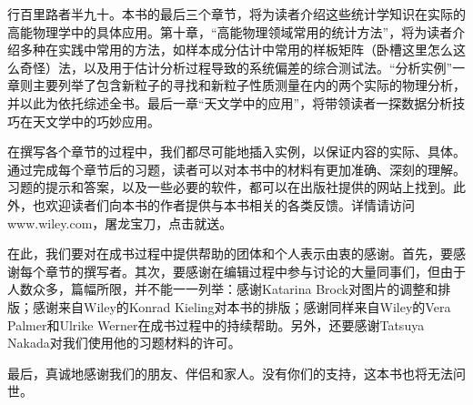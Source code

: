 行百里路者半九十。本书的最后三个章节，将为读者介绍这些统计学知识在实际的高能物理学中的具体应用。第十章，“高能物理领域常用的统计方法”，将为读者介绍多种在实践中常用的方法，如样本成分估计中常用的样板矩阵（卧槽这里怎么这么奇怪）法，以及用于估计分析过程导致的系统偏差的综合测试法。“分析实例”一章则主要列举了包含新粒子的寻找和新粒子性质测量在内的两个实际的物理分析，并以此为依托综述全书。最后一章“天文学中的应用”，将带领读者一探数据分析技巧在天文学中的巧妙应用。

在撰写各个章节的过程中，我们都尽可能地插入实例，以保证内容的实际、具体。通过完成每个章节后的习题，读者可以对本书中的材料有更加准确、深刻的理解。习题的提示和答案，以及一些必要的软件，都可以在出版社提供的网站上找到。此外，也欢迎读者们向本书的作者提供与本书相关的各类反馈。详情请访问www.wiley.com，屠龙宝刀，点击就送。

在此，我们要对在成书过程中提供帮助的团体和个人表示由衷的感谢。首先，要感谢每个章节的撰写者。其次，要感谢在编辑过程中参与讨论的大量同事们，但由于人数众多，篇幅所限，并不能一一列举：感谢Katarina Brock对图片的调整和排版；感谢来自Wiley的Konrad Kieling对本书的排版；感谢同样来自Wiley的Vera Palmer和Ulrike Werner在成书过程中的持续帮助。另外，还要感谢Tatsuya Nakada对我们使用他的习题材料的许可。

最后，真诚地感谢我们的朋友、伴侣和家人。没有你们的支持，这本书也将无法问世。
